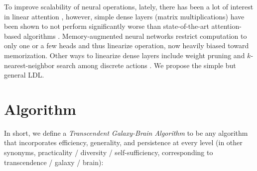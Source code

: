 \documentclass{article}
\begin{document}
To improve scalability of neural operations, lately, there has been a lot of interest in linear attention \cite{schlag2021linear}, however, simple dense layers (matrix multiplications) have been shown to not perform significantly worse than state-of-the-art attention-based algorithms \cite{tolstikhin2021mlpmixer}. Memory-augmented neural networks \cite{collier2019memoryaugmented} restrict computation to only one or a few heads and thus linearize operation, now heavily biased toward memorization. Other ways to linearize dense layers include weight pruning \cite{zhou2021effective} and $k$-nearest-neighbor search among discrete actions \cite{DBLP:journals/corr/Dulac-ArnoldESC15}. We propose the simple but general LDL.

\section{Algorithm}

In short, we define a \textit{Transcendent Galaxy-Brain Algorithm} to be any algorithm that incorporates efficiency, generality, and persistence at every level (in other synonyms, practicality / diversity / self-sufficiency, corresponding to transcendence / galaxy / brain):
\end{document}
